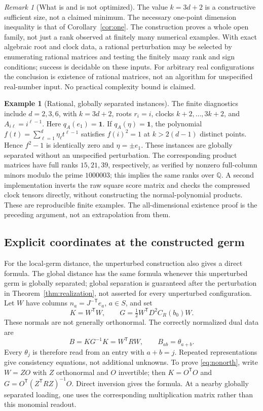 \documentclass[11pt,reqno]{amsart}
\numberwithin{equation}{section}
\theoremstyle{definition}\newtheorem{definition}[theorem]{Definition}
\newtheorem{example}[theorem]{Example}
\theoremstyle{remark}\newtheorem{remark}[theorem]{Remark}
\begin{document}
\begin{remark}[What is and is not optimized]
The value $k=3d+2$ is a constructive sufficient size, not a claimed minimum. The necessary one-point dimension inequality is that of Corollary~\ref{cor:one}. The construction proves a whole open family, not just a rank observed at finitely many numerical examples. With exact algebraic root and clock data, a rational perturbation may be selected by enumerating rational matrices and testing the finitely many rank and sign conditions; success is decidable on these inputs. For arbitrary real configurations the conclusion is existence of rational matrices, not an algorithm for unspecified real-number input. No practical complexity bound is claimed.
\end{remark}

\begin{example}[Rational, globally separated instances]
The finite diagnostics include $d=2,3,6$, with $k=3d+2$, roots $r_i=i$, clocks $k+2,\ldots,3k+2$, and $A_{i\ell}=i^{\ell-1}$. Here $q_A(e_1)=\mathbf1$. If $q_A(\eta)=\mathbf1$, the polynomial $f(t)=\sum_{\ell=1}^d\eta_\ell t^{\ell-1}$ satisfies $f(i)^2=1$ at $k>2(d-1)$ distinct points. Hence $f^2-1$ is identically zero and $\eta=\pm e_1$. These instances are globally separated without an unspecified perturbation. The corresponding product matrices have full ranks $15,21,39$, respectively, as verified by nonzero full-column minors modulo the prime $1000003$; this implies the same ranks over $\mathbb Q$. A second implementation inverts the raw square score matrix and checks the compressed clock tensors directly, without constructing the normal-polynomial products. These are reproducible finite examples. The all-dimensional existence proof is the preceding argument, not an extrapolation from them.
\end{example}

\subsection{Explicit coordinates at the constructed germ}
For the local-germ distance, the unperturbed construction also gives a direct formula. The global distance has the same formula whenever this unperturbed germ is globally separated; global separation is guaranteed after the perturbation in Theorem~\ref{thm:realization}, not asserted for every unperturbed configuration. Let $W$ have columns $n_a=J^{-\mathsf T}e_a$, $a\in S$, and set
\[
 K=W^{\mathsf T}W,\qquad G=\tfrac12W^{\mathsf T}D^2C_R(b_0)W.
\]
These normals are not generally orthonormal. The correctly normalized dual data are
\begin{equation}\label{eq:nonorth}
 B=KG^{-1}K=W^{\mathsf T}RW,
 \qquad B_{ab}=\theta_{a+b}.
\end{equation}
Every $\theta_j$ is therefore read from an entry with $a+b=j$. Repeated representations give consistency equations, not additional unknowns. To prove \eqref{eq:nonorth}, write $W=ZO$ with $Z$ orthonormal and $O$ invertible; then $K=O^{\mathsf T}O$ and $G=O^{\mathsf T}(Z^{\mathsf T}RZ)^{-1}O$. Direct inversion gives the formula. At a nearby globally separated loading, one uses the corresponding multiplication matrix rather than this monomial readout.
\end{document}

